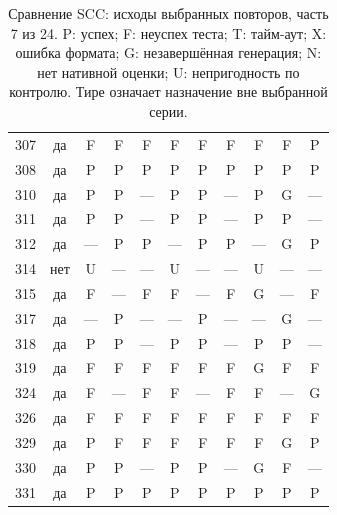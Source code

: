 \begin{table}[p]
\begin{tabular*}{\textwidth}{@{\extracolsep{\fill}}rc*{9}{c}@{}}
307 & да & F & F & F & F & F & F & F & F & P\\
308 & да & P & P & P & P & P & P & P & P & P\\
310 & да & P & P & — & P & P & — & P & G & —\\
311 & да & P & P & — & P & P & — & P & P & —\\
312 & да & — & P & P & — & P & P & — & G & P\\
314 & нет & U & — & — & U & — & — & U & — & —\\
315 & да & F & — & F & F & — & F & G & — & F\\
317 & да & — & P & — & — & P & — & — & G & —\\
318 & да & P & P & — & P & P & — & P & P & —\\
319 & да & F & F & F & F & F & F & G & F & F\\
324 & да & F & — & F & F & — & F & F & — & G\\
326 & да & F & F & F & F & F & F & F & F & F\\
329 & да & P & F & F & F & F & F & F & G & P\\
330 & да & P & P & — & P & P & — & G & F & —\\
331 & да & P & P & P & P & P & P & P & P & P\\
\bottomrule\end{tabular*}
\caption{Сравнение SCC: исходы выбранных повторов, часть 7 из 24. P: успех; F: неуспех теста; T: тайм-аут; X: ошибка формата; G: незавершённая генерация; N: нет нативной оценки; U: непригодность по контролю. Тире означает назначение вне выбранной серии.}
\end{table}
\clearpage
